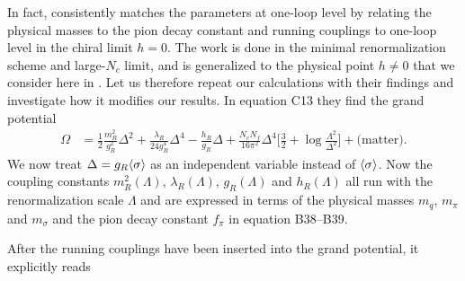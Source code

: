 In fact, \cite{ref:jo_lsm_consistent_chiral} consistently matches the parameters at one-loop level by relating the physical masses to the pion decay constant and running couplings to one-loop level in the chiral limit $h=0$.
The work is done in the minimal renormalization scheme and large-$N_c$ limit, and is generalized to the physical point $h \neq 0$ that we consider here in \cite{ref:jo_lsm_consistent_physical}.
Let us therefore repeat our calculations with their findings and investigate how it modifies our results.
In equation C13 they find the grand potential
\begin{equation}
\begin{split}
	\Omega &= \frac12 \frac{m_R^2}{g_R^2} \Delta^2 + \frac{\lambda_R}{24 g_R^4} \Delta^4 - \frac{h_R}{g_R} \Delta + \frac{N_c N_f}{16 \pi^2} \Delta^4 \bigg[ \frac32 + \log \frac{\Lambda^2}{\Delta^2} \bigg] + \text{(matter)}.
\end{split}
\end{equation}
We now treat $\Delta = g_R \langle \sigma \rangle$ as an independent variable instead of $\langle \sigma \rangle$.
Now the coupling constants $m_R^2(\Lambda)$, $\lambda_R(\Lambda)$, $g_R(\Lambda)$ and $h_R(\Lambda)$ all run with the renormalization scale $\Lambda$ and are expressed in terms of the physical masses $m_q$, $m_\pi$ and $m_\sigma$ and the pion decay constant $f_\pi$ in equation B38--B39.
\iffalse
\begin{equation}
\begin{aligned}
	m_R^2(\Lambda) &= \frac{m_R^2(\Lambda_0)}{1 - \frac{4 g_0^2 N_c}{(4\pi)^2} \log \frac{\Lambda^2}{\Lambda_0^2}}, \qquad & 
	\lambda_R(\Lambda) &= \frac{\lambda_R(0) - \frac{48 g_0^4 N_c}{(4\pi)^2} \log \frac{\Lambda^2}{\Lambda_0^2} }{\Big(1 - \frac{4 g_0^2 N_c}{(4\pi)^2} \log \frac{\Lambda^2}{\Lambda_0^2}\Big)^2}, \\
	g_R^2(\Lambda) &= \frac{g_R^2(0)}{1 - \frac{4 g_0^2 N_c}{(4\pi)^2} \log \frac{\Lambda^2}{\Lambda_0^2}}, \qquad & 
	h_R(\Lambda) &= \frac{h_R(0)}{1 - \frac{2 g_0^2 N_c}{(4\pi)^2} \log \frac{\Lambda^2}{\Lambda_0^2}} .
\end{aligned}
\end{equation}
\fi
After the running couplings have been inserted into the grand potential, it explicitly reads
